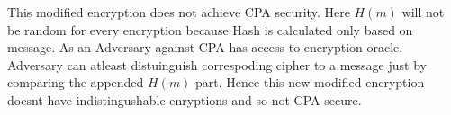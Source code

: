 This modified encryption does not achieve CPA security.
Here $H(m)$ will not be random for every encryption because Hash is 
calculated only based on message. As an Adversary against CPA
has access to encryption oracle, Adversary can atleast distuinguish correspoding 
cipher to a message just by comparing the appended $H(m)$ part. Hence this 
new modified encryption doesnt have indistingushable enryptions and so not
CPA secure.